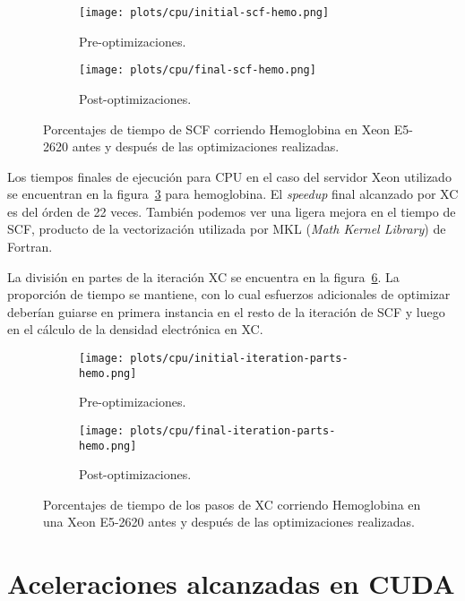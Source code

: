 \begin{figure}[htbp]
\centering
\begin{subfigure}[b]{\plotwidthtres}
   \texttt{[image: plots/cpu/initial-scf-hemo.png]}
   \caption{Pre-optimizaciones.}
   \label{fig:initial-cpu-scf}
 \end{subfigure}
 \begin{subfigure}[b]{\plotwidthtres}
   \texttt{[image: plots/cpu/final-scf-hemo.png]}
   \caption{Post-optimizaciones.}
   \label{fig:final-cpu-scf}
 \end{subfigure}
 \caption{Porcentajes de tiempo de SCF corriendo Hemoglobina en Xeon E5-2620 antes y despu\'es de
 las optimizaciones realizadas.}
 \label{fig:cpu-scf}
\end{figure}

Los tiempos finales de ejecuci\'on para CPU en el caso del servidor Xeon utilizado se encuentran
en la figura~\ref{fig:cpu-scf} para hemoglobina. El \textit{speedup} final alcanzado por XC es del
\'orden de 22 veces. Tambi\'en podemos ver una ligera mejora en el tiempo de SCF,
producto de la vectorizaci\'on utilizada por MKL (\textit{Math Kernel Library}) de
Fortran.

La divisi\'on en partes de la iteraci\'on XC se encuentra en la figura~\ref{fig:cpu-parts}. La
proporci\'on de tiempo se mantiene, con lo cual esfuerzos adicionales de optimizar deber\'ian
guiarse en primera instancia en el resto de la iteraci\'on de SCF y luego en el c\'alculo de
la densidad electr\'onica en XC.

\begin{figure}[htbp]
\centering
\begin{subfigure}[b]{\plotwidthtres}
   \texttt{[image: plots/cpu/initial-iteration-parts-hemo.png]}
   \caption{Pre-optimizaciones.}
   \label{fig:initial-cuda-parts}
 \end{subfigure}
 \begin{subfigure}[b]{\plotwidthtres}
   \texttt{[image: plots/cpu/final-iteration-parts-hemo.png]}
   \caption{Post-optimizaciones.}
   \label{fig:final-cuda-parts}
 \end{subfigure}
 \caption{Porcentajes de tiempo de los pasos de XC corriendo Hemoglobina en una Xeon E5-2620 antes y despu\'es de
 las optimizaciones realizadas.}
 \label{fig:cpu-parts}
\end{figure}

\section{Aceleraciones alcanzadas en CUDA}
\label{resultados-cuda}

